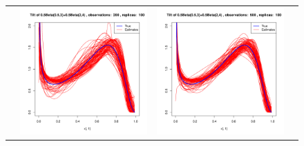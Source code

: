 \begin{figure}[h]
\begin{tabular}{cccc}
	&
	\includegraphics[width=\textwidth/4]{../img/p05_a05_b3_p05_a2_b4/tilted/K2/densities/n200_R100.pdf}
	&
	\includegraphics[width=\textwidth/4]{../img/p05_a05_b3_p05_a2_b4/tilted/K2/densities/n500_R100.pdf}\\
	

\end{tabular}
\end{figure}
